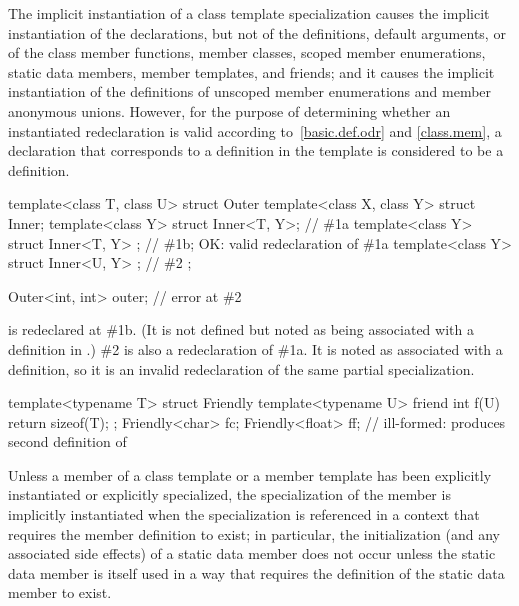 The implicit instantiation of a class template specialization causes
the implicit instantiation of the declarations, but not of the definitions,
default arguments, or  of the
class member functions,
member classes,
scoped member enumerations,
static data members,
member templates, and
friends; and
it causes the implicit instantiation of the definitions of
unscoped member enumerations and member anonymous unions.
However, for the purpose of determining whether an instantiated redeclaration
is valid according to~\ref{basic.def.odr} and \ref{class.mem},
a declaration that corresponds to a definition in the template
is considered to be a definition.
\begin{example}
\begin{codeblock}
template<class T, class U>
struct Outer {
  template<class X, class Y> struct Inner;
  template<class Y> struct Inner<T, Y>;         // \#1a
  template<class Y> struct Inner<T, Y> { };     // \#1b; OK: valid redeclaration of \#1a
  template<class Y> struct Inner<U, Y> { };     // \#2
};

Outer<int, int> outer;                          // error at \#2
\end{codeblock}

 is redeclared at \#1b. (It is not defined
but noted as being associated with a definition in .) \#2
is also a redeclaration of \#1a. It is noted as associated with a definition,
so it is an invalid redeclaration of the same partial specialization.

\begin{codeblock}
template<typename T> struct Friendly {
  template<typename U> friend int f(U) { return sizeof(T); }
};
Friendly<char> fc;
Friendly<float> ff; // ill-formed: produces second definition of 
\end{codeblock}
\end{example}

\pnum
Unless a member of a class template or a member template has been explicitly
instantiated or explicitly specialized,
the specialization of the member is implicitly instantiated when the
specialization is referenced in a context that requires the member definition
to exist;
in particular, the initialization (and any associated side effects) of a
static data member does not occur unless the static data member is itself used
in a way that requires the definition of the static data member to exist.

